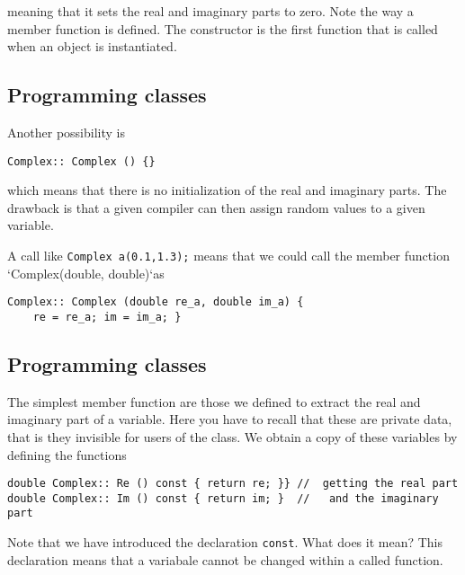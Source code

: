 \documentclass[%
oneside,                 %
final,                   %
10pt]{article}
\begin{document}
meaning that it sets the real and imaginary parts to zero. Note the
way a member function is defined. The constructor is the first
function that is called when an object is instantiated.

\subsection*{Programming classes}

Another possibility is

\begin{verbatim}
Complex:: Complex () {}
\end{verbatim}
which means that there is no initialization of the real and imaginary parts. The drawback is that a given compiler can then assign random values to a given variable.

A call like \Verb!Complex a(0.1,1.3);! means that we could call the member function `Complex(double, double)`as

\begin{verbatim}
Complex:: Complex (double re_a, double im_a) {
    re = re_a; im = im_a; }
\end{verbatim}

\subsection*{Programming classes}

The simplest member function are those we defined to extract
the real and imaginary part of a variable. Here you have to recall that these are private data,
that is they invisible for users of the class.  We obtain a copy of these variables by defining the
functions

\begin{verbatim}
double Complex:: Re () const { return re; }} //  getting the real part
double Complex:: Im () const { return im; }  //   and the imaginary part
\end{verbatim}
Note that we have introduced   the declaration  \Verb!const!.  What does it mean?
This declaration means that a variabale cannot be changed within  a called function.

\end{document}
